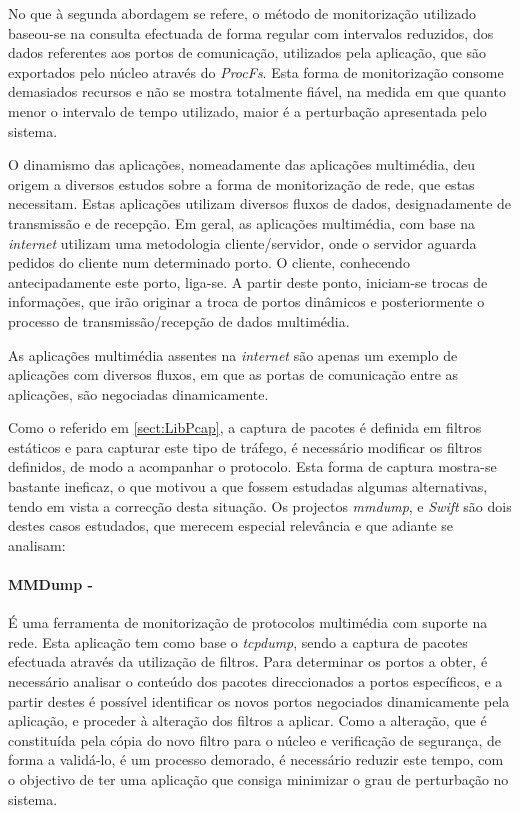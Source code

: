 No que à segunda abordagem se refere, o método de monitorização utilizado baseou-se na consulta efectuada de forma regular com intervalos reduzidos, dos dados referentes aos portos de comunicação, utilizados pela aplicação, que são exportados pelo núcleo através do \textit{ProcFs}.
Esta forma de monitorização consome demasiados recursos e não se mostra totalmente fiável, na medida em que quanto menor o intervalo de tempo utilizado, maior é a perturbação apresentada pelo sistema.

O dinamismo das aplicações, nomeadamente das aplicações multimédia, deu origem a diversos estudos sobre a forma de monitorização de rede, que estas necessitam.
Estas aplicações utilizam diversos fluxos de dados, designadamente de transmissão e de recepção.
Em geral, as aplicações multimédia, com base na \textit{internet} utilizam uma metodologia cliente/servidor, onde o servidor aguarda pedidos do cliente num determinado porto.
O cliente, conhecendo antecipadamente este porto, liga-se.
A partir deste ponto, iniciam-se trocas de informações, que irão originar a troca de portos dinâmicos e posteriormente o processo de transmissão/recepção de dados multimédia.

As aplicações multimédia assentes na \textit{internet} são apenas um exemplo de aplicações com diversos fluxos, em que as portas de comunicação entre as aplicações, são negociadas dinamicamente.

Como o referido em \ref{sect:LibPcap}, a captura de pacotes é definida em filtros estáticos e para capturar este tipo de tráfego, é necessário modificar os filtros definidos, de modo a acompanhar o protocolo.
Esta forma de captura mostra-se bastante ineficaz, o que motivou a que fossem estudadas algumas alternativas, tendo em vista a correcção desta situação.
Os projectos \textit{mmdump}\cite{505678}, %
e \textit{Swift}\cite{1387609} são dois destes casos estudados, que merecem especial relevância e que adiante se analisam:

\paragraph*{MMDump - } É uma ferramenta de monitorização de protocolos multimédia com suporte na rede.
Esta aplicação tem como base o \textit{tcpdump}, sendo a captura de pacotes efectuada através da utilização de filtros.
Para determinar os portos a obter, é necessário analisar o conteúdo dos pacotes direccionados a portos específicos, e a partir destes é possível identificar os novos portos negociados dinamicamente pela aplicação, e proceder à alteração dos filtros a aplicar.
Como a alteração, que é constituída pela cópia do novo filtro para o núcleo e verificação de segurança, de forma a validá-lo, é um processo demorado, é necessário reduzir este tempo, com o objectivo de ter uma aplicação que consiga minimizar o grau de perturbação no sistema.

